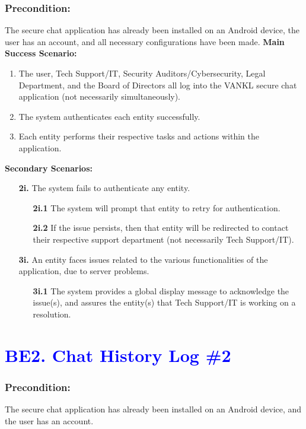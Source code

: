 \documentclass[]{article}
\begin{document}
\subsubsection*{Precondition:} The secure chat application has already been installed on an Android device, the user has an account, and all necessary configurations have been made.\newline\newline
\textbf{Main Success Scenario:}
\begin{enumerate}
	\item The user, Tech Support/IT, Security Auditors/Cybersecurity, Legal Department, and the Board of Directors all log into the VANKL secure chat application (not necessarily simultaneously).
	\item The system authenticates each entity successfully.
	\item Each entity performs their respective tasks and actions within the application.
\end{enumerate}
\textbf{Secondary Scenarios:}
\begin{enumerate}
	\item[\textbf{2i.}] The system fails to authenticate any entity.
		\begin{enumerate}
			\item[\textbf{2i.1}] The system will prompt that entity to retry for authentication.
			\item[\textbf{2i.2}] If the issue persists, then that entity will be redirected to contact their respective support department (not necessarily Tech Support/IT).
		\end{enumerate}
	\item[\textbf{3i.}] An entity faces issues related to the various functionalities of the application, due to server problems.
		\begin{enumerate}
			\item[\textbf{3i.1}] The system provides a global display message to acknowledge the issue(s), and assures the entity(s) that Tech Support/IT is working on a resolution.
		\end{enumerate}
\end{enumerate}

\section*{\textcolor{blue}{BE2. Chat History Log \#2}}
\subsubsection*{Precondition:} The secure chat application has already been installed on an Android device, and the user has an account.
\end{document}
